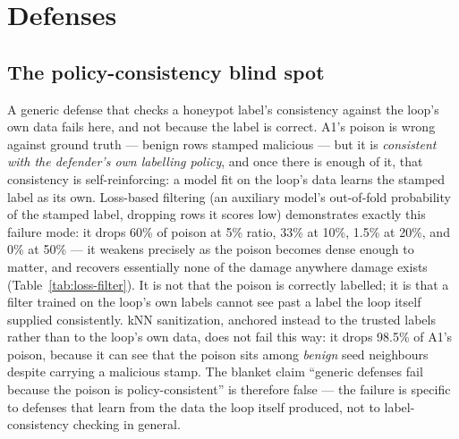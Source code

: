\section{Defenses}
\label{sec:defenses}

\subsection{The policy-consistency blind spot}
A generic defense that checks a honeypot label's consistency against the loop's own data fails
here, and not because the label is correct. A1's poison is wrong against ground truth — benign
rows stamped malicious — but it is \emph{consistent with the defender's own labelling policy},
and once there is enough of it, that consistency is self-reinforcing: a model fit on the loop's
data learns the stamped label as its own. Loss-based filtering (an auxiliary model's out-of-fold
probability of the stamped label, dropping rows it scores low) demonstrates exactly this
failure mode: it drops 60\% of poison at 5\% ratio, 33\% at 10\%, 1.5\% at 20\%, and 0\% at 50\%
— it weakens precisely as the poison becomes dense enough to matter, and recovers essentially
none of the damage anywhere damage exists (Table~\ref{tab:loss-filter}). It is not that the
poison is correctly labelled; it is that a filter trained on the loop's own labels cannot see
past a label the loop itself supplied consistently.
kNN sanitization, anchored instead to the trusted  labels rather than to
the loop's own data, does not fail this way: it drops 98.5\% of A1's poison, because it can see
that the poison sits among \emph{benign} seed neighbours despite carrying a malicious stamp.
The blanket claim “generic defenses fail because the poison is policy-consistent” is therefore
false — the failure is specific to defenses that learn from the data the loop itself produced,
not to label-consistency checking in general.

